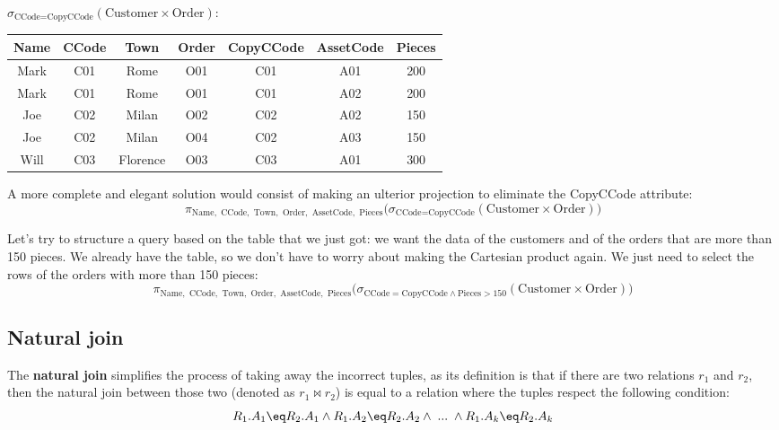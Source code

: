 \begin{center}
    $\sigma_{\text{CCode} = \text{CopyCCode}}(\text{Customer} \times \text{Order})$: \\ \vspace{12pt}
    \begin{tabular}{|c|c|c|c|c|c|c|}
        \hline \rowcolor{maindoccol!60}
        \textbf{Name} & \textbf{CCode} & \textbf{Town} & \textbf{Order} & \textbf{CopyCCode} & \textbf{AssetCode} & \textbf{Pieces} \\
        \hline \rowcolor{green!10}
        Mark & C01 & Rome & O01 & C01 & A01 & 200 \\
        \hline \rowcolor{green!10}
        Mark & C01 & Rome & O01 & C01 & A02 & 200 \\
        \hline \rowcolor{green!10}
        Joe & C02 & Milan & O02 & C02 & A02 & 150 \\
        \hline \rowcolor{green!10}
        Joe & C02 & Milan & O04 & C02 & A03 & 150 \\
        \hline \rowcolor{green!10}
        Will & C03 & Florence & O03 & C03 & A01 & 300 \\
        \hline
    \end{tabular}
\end{center}

A more complete and elegant solution would consist of making an ulterior projection to eliminate the CopyCCode attribute:
\[ \pi_{\text{Name}, \text{ CCode}, \text{ Town}, \text{ Order}, \text{ AssetCode}, \text{ Pieces}} \big( \sigma_{\text{CCode} = \text{CopyCCode}}(\text{Customer} \times \text{Order}) \big) \]

Let's try to structure a query based on the table that we just got: we want the data of the customers and of the orders that are more than 150 pieces. We already have the table, so we don't have to worry about making the Cartesian product again. We just need to select the rows of the orders with more than 150 pieces:
\[ \pi_{\text{Name}, \text{ CCode}, \text{ Town}, \text{ Order}, \text{ AssetCode}, \text{ Pieces}} \big( \sigma_{\text{CCode} = \text{CopyCCode} \wedge \text{Pieces} > 150}(\text{Customer} \times \text{Order}) \big) \]

\subsection{Natural join}

The \textbf{natural join} simplifies the process of taking away the incorrect tuples, as its definition is that if there are two relations $r_1$ and $r_2$, then the natural join between those two (denoted as $r_1 \bowtie r_2$) is equal to a relation where the tuples respect the following condition:
\[ R_1.A_1 \eq R_2.A_1 \wedge R_1.A_2 \eq R_2.A_2 \wedge \; ... \; \wedge R_1.A_k \eq R_2.A_k \]

